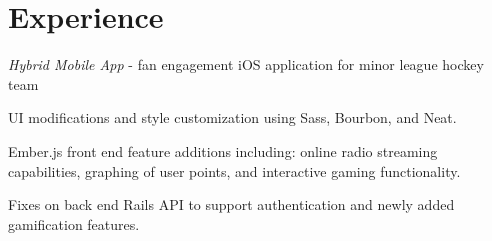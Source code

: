 \documentclass[]{deedy-resume}
\begin{document}
\hfill
\begin{minipage}[t]{0.66\textwidth} 


\section{Experience}

\textit{Hybrid Mobile App} - fan engagement iOS application for minor league hockey team
\vspace{\topsep} %
\begin{tightemize}
\item UI modifications and style customization using Sass, Bourbon, and Neat.
\item Ember.js front end feature additions including: online radio streaming capabilities, graphing of user points, and interactive gaming functionality.
\item Fixes on back end Rails API to support authentication and newly added gamification features.
\end{tightemize}
\sectionsep


\end{minipage}
\end{document}
